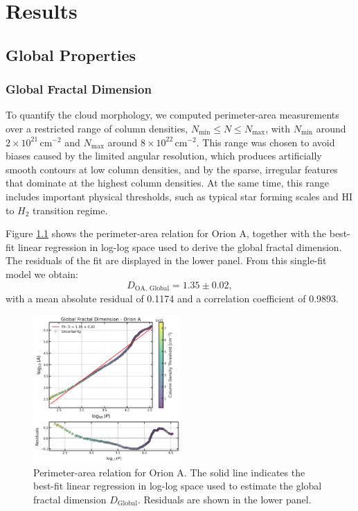 \chapter{Results}
\label{ch:results}

\section{Global Properties}

\subsection{Global Fractal Dimension}

To quantify the cloud morphology, we computed perimeter-area measurements over a restricted range of column densities, \(N_\mathrm{min} \leq N \leq N_\mathrm{max}\), with \(N_\mathrm{min}\) around \(2 \times 10^{21}\,\mathrm{cm}^{-2}\) and \(N_\mathrm{max}\) around \(8 \times 10^{22}\,\mathrm{cm}^{-2}\). This range was chosen to avoid biases caused by the limited angular resolution, which produces artificially smooth contours at low column densities, and by the sparse, irregular features that dominate at the highest column densities. At the same time, this range includes important physical thresholds, such as typical star forming scales and HI to $H_2$ transition regime.

Figure \ref{fig:orion_A_global} shows the perimeter-area relation for Orion A, together with the best-fit linear regression in log-log space used to derive the global fractal dimension. The residuals of the fit are displayed in the lower panel. From this single-fit model we obtain:
\[
D_{\mathrm{OA,\,Global}} = 1.35 \pm 0.02 ,
\]
with a mean absolute residual of 0.1174 and a correlation coefficient of 0.9893.

\begin{figure}[t]
    \centering
    \includegraphics[width=0.5\textwidth]{figures/orion_A_global.png}
    \caption{Perimeter-area relation for Orion A. The solid line indicates the best-fit linear regression in log-log space used to estimate the global fractal dimension \(D_{\mathrm{Global}}\). Residuals are shown in the lower panel.}
    \label{fig:orion_A_global}
\end{figure}

